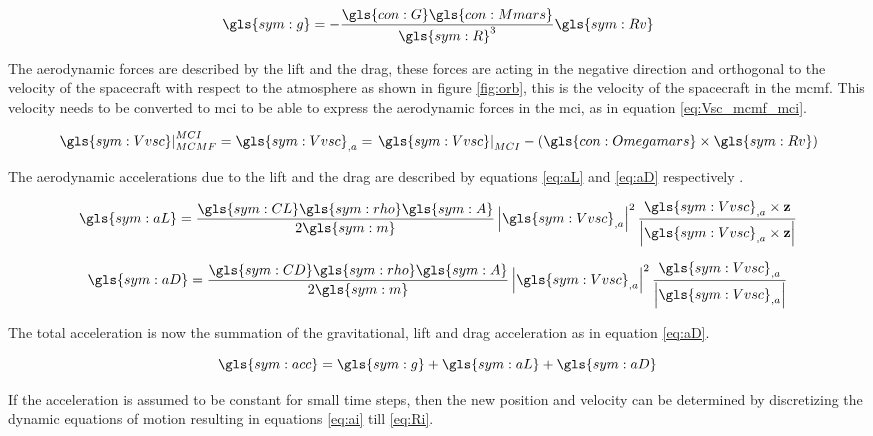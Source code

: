 \begin{equation} \label{eq:nG}
\gls{sym:g} = -\frac{\gls{con:G}\gls{con:Mmars}}
					{\gls{sym:R}^3}\gls{sym:Rv}
\end{equation}

The aerodynamic forces are described by the lift and the drag, these forces are acting in the negative direction and orthogonal to the velocity of the spacecraft with respect to the atmosphere as shown in figure \ref{fig:orb}, this is the velocity of the spacecraft in the \gls{mcmf}. This velocity needs to be converted to \gls{mci} to be able to express the aerodynamic forces in the \gls{mci}, as in equation \ref{eq:Vsc_mcmf_mci}.

\begin{equation} \label{eq:Vsc_mcmf_mci}
\left.\gls{sym:Vvsc}\right|_{MCMF}^{MCI} = \gls{sym:Vvsc}_{,a} = \left.\gls{sym:Vvsc}\right|_{MCI} - \left(\gls{con:Omegamars} \times \gls{sym:Rv} \right)
\end{equation}

The aerodynamic accelerations due to the lift and the drag are described by equations \ref{eq:aL} and \ref{eq:aD} respectively \cite{AndersonJr.2007}.

\begin{equation} \label{eq:aL}
\gls{sym:aL} = \frac{\gls{sym:CL}\gls{sym:rho}\gls{sym:A}}{2 \gls{sym:m}} 
				\left|\gls{sym:Vvsc}_{,a}\right|^2
				\frac{\gls{sym:Vvsc}_{,a} \times \mathbf{z}}
				{\left| \gls{sym:Vvsc}_{,a} \times \mathbf{z}\right|}
\end{equation}

\begin{equation} \label{eq:aD}
\gls{sym:aD} = \frac{\gls{sym:CD}\gls{sym:rho}\gls{sym:A}}{2 \gls{sym:m}}
				\left|\gls{sym:Vvsc}_{,a}\right|^2 \frac{\gls{sym:Vvsc}_{,a}}{\left|\gls{sym:Vvsc}_{,a}\right|}
\end{equation}

The total acceleration is now the summation of the gravitational, lift and drag acceleration as in equation \ref{eq:aD}.

\begin{equation} \label{eq:acc}
\gls{sym:acc} = \gls{sym:g} + \gls{sym:aL} + \gls{sym:aD}
\end{equation}

If the acceleration is assumed to be constant for small time steps, then the new position and velocity can be determined by discretizing the dynamic equations of motion resulting in equations \ref{eq:ai} till \ref{eq:Ri}.

